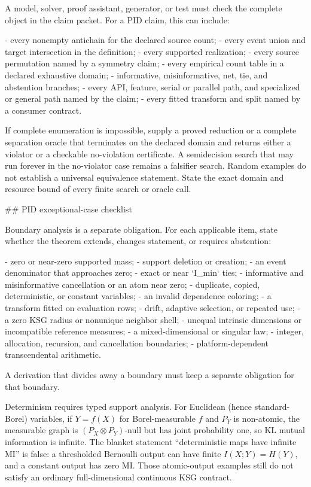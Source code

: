 \documentclass[11pt]{article}
\begin{document}
\begin{markdown}
A model, solver, proof assistant, generator, or test must check the complete object in the claim
packet. For a PID claim, this can include:

- every nonempty antichain for the declared source count;
- every event union and target intersection in the definition;
- every supported realization;
- every source permutation named by a symmetry claim;
- every empirical count table in a declared exhaustive domain;
- informative, misinformative, net, tie, and abstention branches;
- every API, feature, serial or parallel path, and specialized or general path named by the claim;
- every fitted transform and split named by a consumer contract.

If complete enumeration is impossible, supply a proved reduction or a complete separation oracle
that terminates on the declared domain and returns either a violator or a checkable no-violation
certificate. A semidecision search that may run forever in the no-violator case remains a falsifier
search. Random examples do not establish a universal equivalence statement. State the exact domain
and resource bound of every finite search or oracle call.

## PID exceptional-case checklist

Boundary analysis is a separate obligation. For each applicable item, state whether the theorem
extends, changes statement, or requires abstention:

- zero or near-zero supported mass;
- support deletion or creation;
- an event denominator that approaches zero;
- exact or near `I_min` ties;
- informative and misinformative cancellation or an atom near zero;
- duplicate, copied, deterministic, or constant variables;
- an invalid dependence coloring;
- a transform fitted on evaluation rows;
- drift, adaptive selection, or repeated use;
- a zero KSG radius or nonunique neighbor shell;
- unequal intrinsic dimensions or incompatible reference measures;
- a mixed-dimensional or singular law;
- integer, allocation, recursion, and cancellation boundaries;
- platform-dependent transcendental arithmetic.

A derivation that divides away a boundary must keep a separate obligation for that boundary.

Determinism requires typed support analysis. For Euclidean (hence standard-Borel) variables, if
$Y=f(X)$ for Borel-measurable $f$ and $P_Y$ is non-atomic, the measurable graph is
$(P_X\otimes P_Y)$-null but has joint probability one, so KL mutual information is infinite. The
blanket statement “deterministic maps have infinite MI” is false: a thresholded Bernoulli output
can have finite $I(X;Y)=H(Y)$, and a constant output has zero MI. Those atomic-output examples still
do not satisfy an ordinary full-dimensional continuous KSG contract.


\end{markdown}
\end{document}

